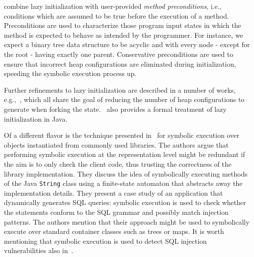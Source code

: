 \cite{KPV-TACAS03,SPF-ISSTA04} combine lazy initialization with user-provided {\em method preconditions}, i.e., conditions which are assumed to be true before the execution of a method. Preconditions are used to characterize those program input states in which the method is expected to behave as intended by the programmer. For instance, we expect a binary tree data structure to be acyclic and with every node - except for the root - having exactly one parent. Conservative preconditions are used to ensure that incorrect heap configurations are eliminated during initialization, speeding the symbolic execution process up.

Further refinements to lazy initialization are described in a number of works, e.g.,~\cite{DLR-ASE12,BLI-NFM13,BLISS-TSE15}, which all share the goal of reducing the number of heap configurations to generate when forking the state.~\cite{DLR-ASE12} also provides a formal treatment of lazy initialization in Java.

Of a different flavor is the technique presented in~\cite{SHZ-TAIC07} for symbolic execution over objects instantiated from commonly used libraries. The authors argue that performing symbolic execution at the representation level might be redundant if the aim is to only check the client code, thus trusting the correctness of the library implementation. They discuss the idea of symbolically executing methods of the Java {\tt String} class using a finite-state automaton that abstracts away the implementation details. They present a case study of an application that dynamically generates SQL queries: symbolic execution is used to check whether the statements conform to the SQL grammar and possibly match injection patterns. The authors mention that their approach might be used to symbolically execute over standard container classes such as trees or maps. It is worth mentioning that symbolic execution is used to detect SQL injection vulnerabilities also in~\cite{FLP-COMPSAC07}.




